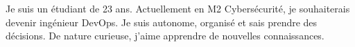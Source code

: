 
\begin{cvparagraph}
Je suis un étudiant de 23 ans. Actuellement en M2 Cybersécurité, je souhaiterais devenir ingénieur DevOps. Je suis autonome, organisé et sais prendre des décisions. De nature curieuse, j'aime apprendre de nouvelles connaissances.
\end{cvparagraph}
